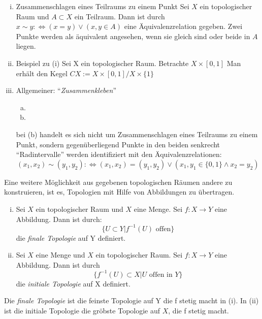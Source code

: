 \documentclass[a4paper,10pt]{scrartcl}
\renewcommand{\equiv}{\Longleftrightarrow}
\begin{document}
\begin{ex*}
\begin{enumerate}[(i)]
\item \begin{seg}{Zusammenschlagen eines Teilraums zu einem Punkt}
Sei $ X $ ein topologischer Raum und $ A\subset X $ ein Teilraum. Dann ist durch $ x \sim y :\equiv (x=y)\lor (x,y\in A) $ eine Äquivalenzrelation gegeben.  Zwei Punkte werden als äquivalent angesehen, wenn sie gleich sind oder beide in $ A $ liegen.
\end{seg}
\item \begin{seg}{Beispiel zu (i)}
Sei X ein topologischer Raum. Betrachte $ X\times [0,1] $
\fixme[fig9]
Man erhält den Kegel $CX:=X\times[0,1]/X\times\{1\}$
\end{seg}
\item Allgemeiner: "`\emph{Zusammenkleben}"'
\begin{enumerate}[(a)]
\item \fixme[fig10]
\item \fixme[fig11]
\end{enumerate}
bei (b) handelt es sich nicht um Zusammenschlagen eines Teilraums zu einem Punkt, sondern gegenüberliegend Punkte in den beiden senkrecht "`Radintervalle"' werden identifiziert mit den Äquivalenzrelationen: \fixme[nachschauen]
\[
(x_1,x_2)\sim (y_1,y_2):\equiv (x_1,x_2)=(y_1,y_2)\lor (x_1,y_1 \in \{0,1\} \land x_2 =y_2)
\]
\end{enumerate}
\end{ex*}
Eine weitere Möglichkeit aus gegebenen topologischen Räumen andere zu konstruieren, ist es, Topologien mit Hilfe von Abbildungen zu übertragen.
\begin{df}\label{thm:2.5}
\begin{enumerate}[(i)]
\item Sei $ X $ ein topologischer Raum und $ X $ eine Menge.  Sei $ f: X\to Y$ eine Abbildung.  Dann ist durch:
\[
\{U\subset Y|f^{-1}(U) \text{ offen} \}
\]
die \emph{finale Topologie} auf Y definiert.
\item Sei $ X $ eine Menge und $ X $ ein topologischer Raum.  Sei $ f: X\to Y $ eine Abbildung.  Dann ist durch 
\[
\{ f^{-1}(U)\subset X| U \text{ offen in } Y\}
\]
die \emph{initiale Topologie} auf X definiert.
\end{enumerate}
\end{df}
\begin{note*}
Die \emph{finale Topologie} ist die feinste Topologie auf Y die f stetig macht in (i). In (ii) ist die initiale Topologie die gröbste Topologie auf $ X $, die f stetig macht.
\end{note*}
\end{document}
